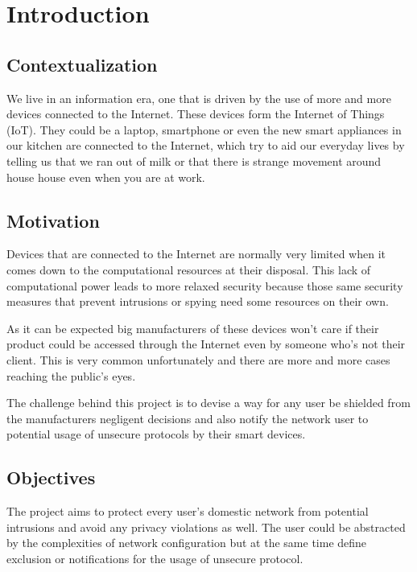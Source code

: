 \chapter{Introduction}
\label{chap:intro}

\section{Contextualization}
\label{sec:context} %
We live in an information era, one that is driven by the use of more and more
devices connected to the Internet. These devices form the Internet of Things
(IoT). They could be a laptop, smartphone or even the new smart appliances in
our kitchen are connected to the Internet, which try to aid our everyday lives
by telling us that we ran out of milk or that there is strange movement around
house house even when you are at work.



\section{Motivation}
\label{sec:mot}
Devices that are connected to the Internet are normally very limited when it
comes down to the computational resources at their disposal. This lack of
computational power leads to more relaxed security because those same security
measures that prevent intrusions or spying need some resources on their own.

As it can be expected big manufacturers of these devices won't care if their
product could be accessed through the Internet even by someone who's not their
client. This is very common unfortunately and there are more and more cases
reaching the public's eyes.

The challenge behind this project is to devise a way for any user be shielded
from the manufacturers negligent decisions and also notify the network user to
potential usage of unsecure protocols by their smart devices.

\section{Objectives}
\label{sec:obj}
The project aims to protect every user's domestic network from potential
intrusions and avoid any privacy violations as well. The user could be
abstracted by the complexities of network configuration but at the same time
define exclusion or notifications for the usage of unsecure protocol.

